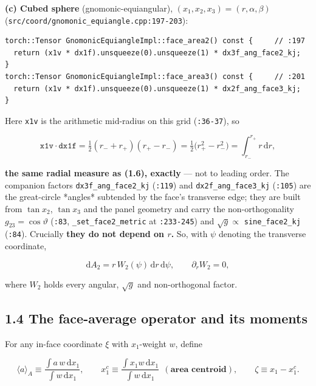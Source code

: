 \documentclass[11pt,a4paper]{article}
\begin{document}
\textbf{(c) Cubed sphere} (gnomonic-equiangular), $(x_1,x_2,x_3)=(r,\alpha,\beta)$
(\texttt{src/coord/gnomonic\_equiangle.cpp:197-203}):

\begin{lstlisting}
torch::Tensor GnomonicEquiangleImpl::face_area2() const {     // :197
  return (x1v * dx1f).unsqueeze(0).unsqueeze(1) * dx3f_ang_face2_kj;
}
torch::Tensor GnomonicEquiangleImpl::face_area3() const {     // :201
  return (x1v * dx1f).unsqueeze(0).unsqueeze(1) * dx2f_ang_face3_kj;
}
\end{lstlisting}

Here \texttt{x1v} is the arithmetic mid-radius on this grid (\texttt{:36-37}), so

\begin{equation*}
\texttt{x1v}\cdot\texttt{dx1f} = \tfrac12(r_-+r_+)(r_+-r_-)
= \tfrac12\big(r_+^2-r_-^2\big) = \int_{r_-}^{r_+} r\,\mathrm{d}r ,
\tag{1.7}
\end{equation*}

\textbf{the same radial measure as (1.6), exactly} — not to leading order. The
companion factors \texttt{dx3f\_ang\_face2\_kj} (\texttt{:119}) and \texttt{dx2f\_ang\_face3\_kj} (\texttt{:105})
are the great-circle *angles* subtended by the face's transverse edge; they are
built from $\tan x_2$, $\tan x_3$ and the panel geometry and carry the
non-orthogonality $g_{23}=\cos\vartheta$ (\texttt{:83},
\texttt{\_set\_face2\_metric} at \texttt{:233-245}) and $\sqrt{g}\propto$ \texttt{sine\_face2\_kj}
(\texttt{:84}). Crucially \textbf{they do not depend on $r$.} So, with $\psi$ denoting the
transverse coordinate,

\begin{equation*}
\mathrm{d}A_2 = r\,W_2(\psi)\,\mathrm{d}r\,\mathrm{d}\psi,
\qquad \partial_r W_2 = 0 ,
\tag{1.8}
\end{equation*}

where $W_2$ holds every angular, $\sqrt{g}$ and non-orthogonal factor.

\subsection*{1.4 The face-average operator and its moments}

For any in-face coordinate $\xi$ with $x_1$-weight $w$, define

\begin{equation*}
\langle a\rangle_A \equiv \frac{\int a\,w\,\mathrm{d}x_1}{\int w\,\mathrm{d}x_1},
\qquad
x_1^{c} \equiv \frac{\int x_1 w\,\mathrm{d}x_1}{\int w\,\mathrm{d}x_1}
\ \ (\textbf{area centroid}),
\qquad
\zeta \equiv x_1-x_1^{c} .
\tag{1.9}
\end{equation*}
\end{document}
